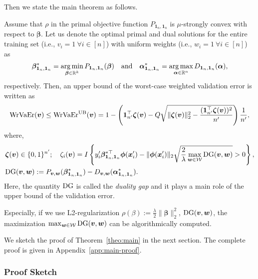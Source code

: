 Then we state the main theorem as follows.
\begin{theorem}
 \label{theo:main}
 {Assume that $\rho$ in the primal objective function $P_{\bm 1_n, \bm 1_n}$ is $\mu$-strongly convex with respect to $\bm \beta$.}
 Let us denote the optimal primal and dual solutions for the entire training set (i.e., $v_i = 1 ~ \forall i \in [n]$) with uniform weights (i.e., $w_i = 1 ~ \forall i \in [n]$) as
 \begin{align*}
  \bm \beta^*_{\bm 1_n, \bm 1_n} = \operatorname*{arg\,min}_{\bm \beta \in \mathbb{R}^k} P_{\bm 1_n, \bm 1_n}(\bm \beta)
  \quad\text{and}\quad
  \bm \alpha^*_{\bm 1_n, \bm 1_n} = \operatorname*{arg\,max}_{\bm \alpha \in \mathbb{R}^n} D_{\bm 1_n, \bm 1_n}(\bm \alpha),
 \end{align*}
 respectively.
 Then, an upper bound of the worst-case weighted validation error is written as 
 \begin{align}
  \label{eq:main-bound}
  {\rm WrVaEr}(\bm v)
  \le
  {\rm WrVaEr}^{\rm UB}(\bm v)
  =
  1
  -
  \left(
  \bm 1_{n^\prime}^\top \bm \zeta(\bm v)
  -
  Q
  \sqrt{
  \|\bm \zeta(\bm v)\|_2^2
  -
  \frac{
  (\bm 1_{n^\prime}^\top \bm \zeta(\bm v))^2
  }{
  n^\prime
  }
  }
  \right)
  \frac{1}{n^\prime},
 \end{align}
 where,
 \begin{align}
  \label{eq:zeta}
  & \bm \zeta(\bm v) \in \{0, 1\}^{n^\prime};
  \quad
  \zeta_i(\bm v)
  =
  I\left\{
  y_i^\prime \bm \beta_{\bm 1_n, \bm 1_n}^{*\top} \bm \phi(\bm x_i^\prime) - \|\bm \phi(\bm x_i^\prime)\|_2 \sqrt{\frac{2}{\lambda} \max_{\bm w \in {\mathcal W}} {\rm DG}(\bm v, \bm w)} > 0
  \right\}, \\
 \label{eq:duality_gap}
 & {\rm DG}(\bm v, \bm w) := P_{\bm v, \bm w}(\bm \beta^*_{\bm 1_n, \bm 1_n}) - D_{\bm v, \bm w}({\bm \alpha}_{\bm 1_n, \bm 1_n}^{*}).
\end{align}
Here, the quantity ${\rm DG}$ is called the {\em duality gap} and it plays a main role of the upper bound of the validation error.

Especially, if we use L2-regularization $\rho(\beta) := \frac{\lambda}{2}\|\bm\beta\|_2^2$, ${\rm DG}(\bm v, \bm w)$, the maximization $\max_{\bm w \in {\mathcal W}} {\rm DG}(\bm v, \bm w)$ can be algorithmically computed.
\end{theorem}

We sketch the proof of Theorem~\ref{theo:main} in the next section. The complete proof is given in {Appendix~\ref{app:main-proof}}.

\subsubsection{Proof Sketch}

